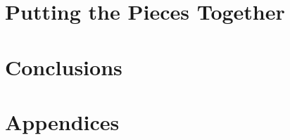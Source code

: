 \documentclass[12pt,chapterprefix=true,listof=totoc]{scrbook}
\begin{document}











%

%



















%

\part{Putting the Pieces Together}







%

%

\part{Conclusions}

\part{Appendices}

\cleardoubleoddpage
\appendix
\renewcommand{\chaptermark}[1]{\markboth{Appendix\ \thechapter.\ #1}{}}





\cleardoubleoddpage
\listoffigures
\listoftables
\listoftheorems[ignoreall,show={definition},numwidth=3.5em]
\printglossaries
\end{document}
